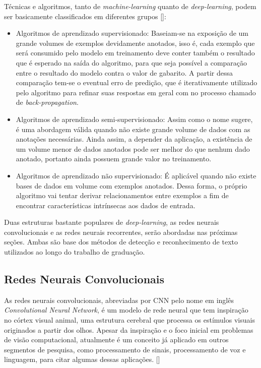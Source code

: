 Técnicas e algoritmos, tanto de \textit{machine-learning} quanto de \textit{deep-learning}, podem ser basicamente classificados em diferentes grupos []:
\begin{itemize}
    \item Algoritmos de aprendizado supervisionado: Baseiam-se na exposição de um grande volumes de exemplos devidamente anotados, isso é, cada exemplo que será consumido pelo modelo em treinamento deve conter também o resultado que é esperado na saída do algoritmo, para que seja possível a comparação entre o resultado do modelo contra o valor de gabarito. A partir dessa comparação tem-se o eventual erro de predição, que é iterativamente utilizado pelo algoritmo para refinar suas respostas em geral com no processo chamado de \textit{back-propagation}.
    \item Algoritmos de aprendizado semi-supervisionado: Assim como o nome sugere, é uma abordagem válida quando não existe grande volume de dados com as anotações necessárias. Ainda assim, a depender da aplicação, a existência de um volume menor de dados anotados pode ser melhor do que nenhum dado anotado, portanto ainda possuem grande valor no treinamento.
    \item Algoritmos de aprendizado não supervisionado: É aplicável quando não existe bases de dados em volume com exemplos anotados. Dessa forma, o próprio algoritmo vai tentar derivar relacionamentos entre exemplos a fim de encontrar características intrínsecas aos dados de entrada.
\end{itemize}

Duas estruturas bastante populares de \textit{deep-learning}, as redes neurais convolucionais e as redes neurais recorrentes, serão abordadas nas próximas seções. Ambas são base dos métodos de detecção e reconhecimento de texto utilizados ao longo do trabalho de graduação.


\subsection{Redes Neurais Convolucionais}
As redes neurais convolucionais, abreviadas por CNN pelo nome em inglês \textit{Convolutional Neural Network}, é um modelo de rede neural que tem inspiração no córtex visual animal, uma estrutura cerebral que processa os estímulos visuais originados a partir dos olhos. Apesar da inspiração e o foco inicial em problemas de visão computacional, atualmente é um conceito já aplicado em outros segmentos de pesquisa, como processamento de sinais, processamento de voz e linguagem, para citar algumas dessas aplicações. []

